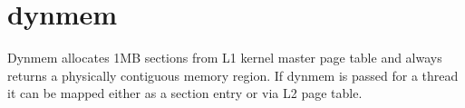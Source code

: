 \chapter{dynmem}

Dynmem allocates 1MB sections from L1 kernel master page table and always
returns a physically contiguous memory region. If dynmem is passed for a thread
it can be mapped either as a section entry or via L2 page table.

